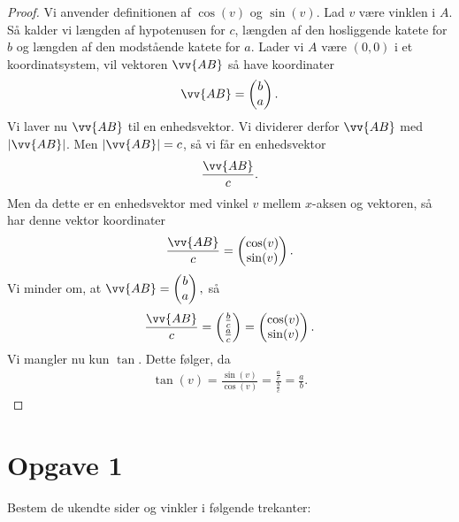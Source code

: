 \begin{proof}
Vi anvender definitionen af $\cos(v)$ og $\sin(v)$. Lad $v$ være vinklen i $A$. Så kalder vi længden af hypotenusen for $c$, længden af den hosliggende katete for $b$ og længden af den modstående katete for $a$. Lader vi $A$ være $(0,0)$ i et koordinatsystem, vil vektoren $\vv{AB}$ så have koordinater
\begin{align*}
\vv{AB} = \begin{pmatrix}
b \\ a
\end{pmatrix}.
\end{align*}
Vi laver nu $\vv{AB}$ til en enhedsvektor. Vi dividerer derfor $\vv{AB}$ med $|\vv{AB}|$. Men $|\vv{AB}| = c$, så vi får en enhedsvektor
\begin{align*}
\frac{\vv{AB}}{c}.
\end{align*}
Men da dette er en enhedsvektor med vinkel $v$ mellem $x$-aksen og vektoren, så har denne vektor koordinater
\begin{align*}
\frac{\vv{AB}}{c} = \begin{pmatrix}
\cos(v) \\ \sin(v)
\end{pmatrix}.
\end{align*}
Vi minder om, at $\vv{AB}=\begin{pmatrix}
b\\ a
\end{pmatrix},$
så
\begin{align*}
\frac{\vv{AB}}{c} = \begin{pmatrix}
\frac{b}{c} \\ \frac{a}{c}
\end{pmatrix} = \begin{pmatrix}
\cos(v) \\ \sin(v)
\end{pmatrix}.
\end{align*}
Vi mangler nu kun $\tan$. Dette følger, da 
\begin{align*}
\tan(v) = \frac{\sin(v)}{\cos(v)} =  \frac{\frac{a}{c}}{\frac{b}{c}} = \frac{a}{b}.
\end{align*}
\end{proof}

\section*{Opgave 1}
Bestem de ukendte sider og vinkler i følgende trekanter:



